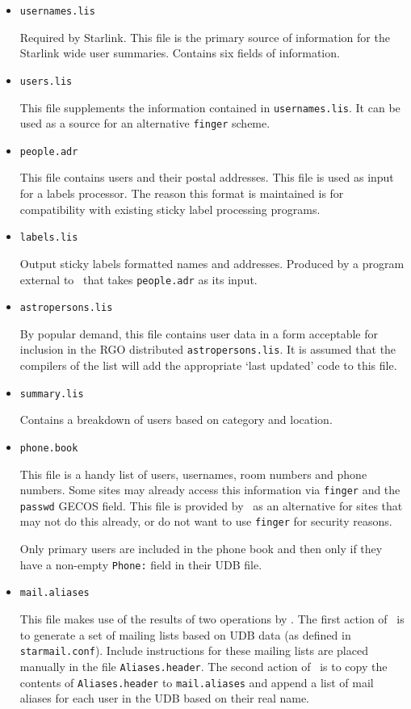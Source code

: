 \begin{itemize}
\item {\Large\tt usernames.lis} 

Required by Starlink. This file is the primary source of information for the
Starlink wide user summaries. Contains six fields of information. 

\item {\Large\tt users.lis} 

This file supplements the information contained in {\tt usernames.lis}. It can
be used as a source for an alternative {\tt finger} scheme.

\item {\Large\tt people.adr}  

This file contains users and their postal addresses. This file is used as 
input for a labels processor. The reason this format is maintained is for
compatibility with existing sticky label processing programs.

\item {\Large\tt labels.lis}  

Output sticky labels formatted names and addresses. Produced by a program
external to \staradmin\ that takes {\tt people.adr} as its input.

\item {\Large\tt astropersons.lis}

By popular demand, this file contains user data in a form acceptable for
inclusion in the RGO distributed {\tt astropersons.lis}. It is assumed that the
compilers of the list will add the appropriate `last updated' code to this
file.

\item {\Large\tt summary.lis}

Contains a breakdown of users based on category and location. 

\item {\Large\tt phone.book}

This file is a handy list of users, usernames, room numbers and phone numbers.
Some sites may already access this information via {\tt finger} and the {\tt
passwd} GECOS field. This file is provided by \staradmin\ as an alternative
for sites that may not do this already, or do not want to use {\tt finger} for
security reasons.

Only primary users are included in the phone book and then only if they have a
non-empty {\tt Phone:} field in their UDB file.

\item {\Large\tt mail.aliases}

This file makes use of the results of two operations by \staradmin. The first 
action of \staradmin\ is to generate a set of mailing lists based on UDB data
(as defined in {\tt starmail.conf}). Include instructions for these mailing 
lists are placed manually in
the file {\tt Aliases.header}. The second action of \staradmin\ is to copy the 
contents of {\tt Aliases.header} to {\tt mail.aliases} and append a list of
mail aliases for each user in the UDB based on their real name.

\end{itemize}

